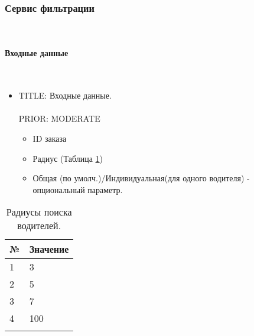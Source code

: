 \subsubsection{Сервис фильтрации} \mbox{} \\ \label{driver_filters_taxi_service}

      \paragraph{Входные данные} \mbox{} \\ \label{driver_filters_taxi_service_input_data}

        \begin{itemize}

          \item{

            TITLE: Входные данные.\\
            \\
            PRIOR: MODERATE\\

          }

          \begin{itemize}
            \item ID заказа
            \item Радиус (Таблица \ref{table_of_searching_driver_radius})
            \item Общая (по умолч.)/Индивидуальная(для одного водителя) - опциональный параметр.
          \end{itemize}

        \end{itemize}
        
        \begin{table}[h]
        \begin{center}  
        \caption{Радиусы поиска водителей.}
        \setlength{\extrarowheight}{2mm}
        \begin{tabular}{|p{2cm}|p{3cm}|}

        \hline     \textbf{№}&\textbf{Значение} \\ [2mm]

        \hline   1  & 3\\ [2mm]
        \hline   2  & 5\\ [2mm]
        \hline   3  & 7\\ [2mm]
        \hline   4 & 100\\ [2mm]
        \hline

        \label{table_of_searching_driver_radius}
        \end{tabular}
        \end{center}
        \end{table}


